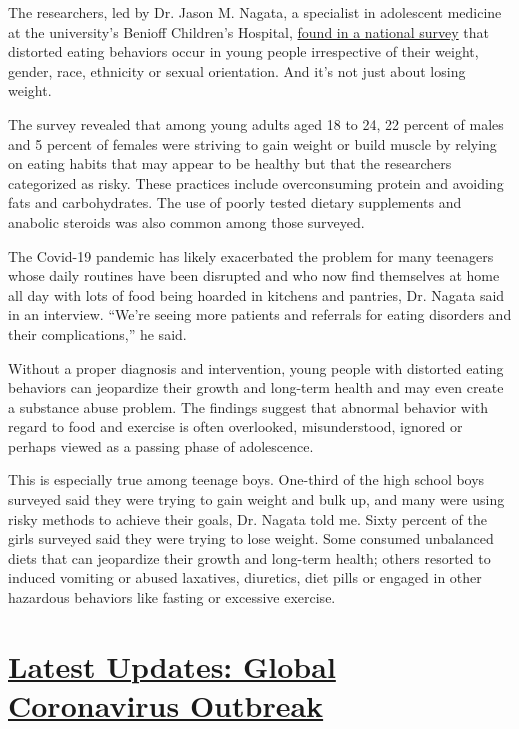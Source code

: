 The researchers, led by Dr. Jason M. Nagata, a specialist in adolescent
medicine at the university's Benioff Children's Hospital,
\href{https://onlinelibrary.wiley.com/doi/full/10.1002/eat.23094}{found
in a national survey} that distorted eating behaviors occur in young
people irrespective of their weight, gender, race, ethnicity or sexual
orientation. And it's not just about losing weight.

The survey revealed that among young adults aged 18 to 24, 22 percent of
males and 5 percent of females were striving to gain weight or build
muscle by relying on eating habits that may appear to be healthy but
that the researchers categorized as risky. These practices include
overconsuming protein and avoiding fats and carbohydrates. The use of
poorly tested dietary supplements and anabolic steroids was also common
among those surveyed.

The Covid-19 pandemic has likely exacerbated the problem for many
teenagers whose daily routines have been disrupted and who now find
themselves at home all day with lots of food being hoarded in kitchens
and pantries, Dr. Nagata said in an interview. ``We're seeing more
patients and referrals for eating disorders and their complications,''
he said.

Without a proper diagnosis and intervention, young people with distorted
eating behaviors can jeopardize their growth and long-term health and
may even create a substance abuse problem. The findings suggest that
abnormal behavior with regard to food and exercise is often overlooked,
misunderstood, ignored or perhaps viewed as a passing phase of
adolescence.

This is especially true among teenage boys. One-third of the high school
boys surveyed said they were trying to gain weight and bulk up, and many
were using risky methods to achieve their goals, Dr. Nagata told me.
Sixty percent of the girls surveyed said they were trying to lose
weight. Some consumed unbalanced diets that can jeopardize their growth
and long-term health; others resorted to induced vomiting or abused
laxatives, diuretics, diet pills or engaged in other hazardous behaviors
like fasting or excessive exercise.

\hypertarget{latest-updates-global-coronavirus-outbreak}{%
\section{\texorpdfstring{\href{https://www.nytimes.com/2020/08/01/world/coronavirus-covid-19.html?action=click\&pgtype=Article\&state=default\&region=MAIN_CONTENT_1\&context=storylines_live_updates}{Latest
Updates: Global Coronavirus
Outbreak}}{Latest Updates: Global Coronavirus Outbreak}}\label{latest-updates-global-coronavirus-outbreak}}


